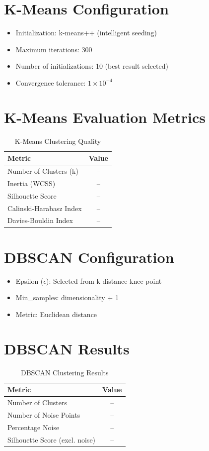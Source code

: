 \section*{K-Means Configuration}
\begin{itemize}
    \item Initialization: k-means++ (intelligent seeding)
    \item Maximum iterations: 300
    \item Number of initializations: 10 (best result selected)
    \item Convergence tolerance: $1 \times 10^{-4}$
\end{itemize}

\section*{K-Means Evaluation Metrics}
\begin{table}[H]
\centering
\caption{K-Means Clustering Quality}
\begin{tabular}{|l|c|}
\hline
\textbf{Metric} & \textbf{Value} \\
\hline
Number of Clusters (k) & -- \\
Inertia (WCSS) & -- \\
Silhouette Score & -- \\
Calinski-Harabasz Index & -- \\
Davies-Bouldin Index & -- \\
\hline
\end{tabular}
\end{table}

\section*{DBSCAN Configuration}
\begin{itemize}
    \item Epsilon ($\epsilon$): Selected from k-distance knee point
    \item Min\_samples: dimensionality + 1
    \item Metric: Euclidean distance
\end{itemize}

\section*{DBSCAN Results}
\begin{table}[H]
\centering
\caption{DBSCAN Clustering Results}
\begin{tabular}{|l|c|}
\hline
\textbf{Metric} & \textbf{Value} \\
\hline
Number of Clusters & -- \\
Number of Noise Points & -- \\
Percentage Noise & -- \\
Silhouette Score (excl. noise) & -- \\
\hline
\end{tabular}
\end{table}

